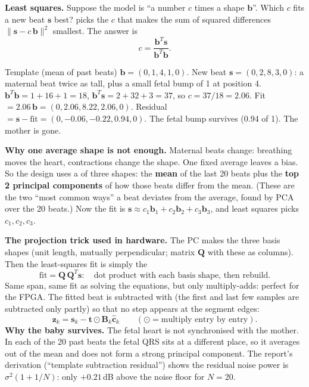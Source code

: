 \documentclass[11pt]{article}
\begin{document}
\textbf{Least squares.} Suppose the model is ``a number $c$ times a shape $\mathbf{b}$''. Which $c$ fits a new beat $\mathbf{s}$ best?  picks the $c$ that makes the sum of squared differences $\|\mathbf{s} - c\,\mathbf{b}\|^2$ smallest. The answer is
\[
c = \frac{\mathbf{b}^T\mathbf{s}}{\mathbf{b}^T\mathbf{b}} .
\]
\begin{simple}
Template (mean of past beats) $\mathbf{b} = (0, 1, 4, 1, 0)$. New beat $\mathbf{s} = (0, 2, 8, 3, 0)$: a maternal beat twice as tall, plus a small fetal bump of 1 at position 4.
$\mathbf{b}^T\mathbf{b} = 1+16+1 = 18$, $\mathbf{b}^T\mathbf{s} = 2+32+3 = 37$, so $c = 37/18 = 2.06$.
Fit $= 2.06\,\mathbf{b} = (0, 2.06, 8.22, 2.06, 0)$. Residual $= \mathbf{s} - \text{fit} = (0, -0.06, -0.22, \mathbf{0.94}, 0)$.
The fetal bump survives (0.94 of 1). The mother is gone.
\end{simple}

\textbf{Why one average shape is not enough.} Maternal beats change: breathing moves the heart, contractions change the shape. One fixed average leaves a bias. So the design uses a  of three shapes: the \textbf{mean} of the last 20 beats plus the \textbf{top 2 principal components} of how those beats differ from the mean. (These are the two ``most common ways'' a beat deviates from the average, found by PCA over the 20 beats.) Now the fit is $\mathbf{s} \approx c_1\mathbf{b}_1 + c_2\mathbf{b}_2 + c_3\mathbf{b}_3$, and least squares picks $c_1, c_2, c_3$.

\textbf{The projection trick used in hardware.} The PC makes the three basis shapes  (unit length, mutually perpendicular; matrix $\mathbf{Q}$ with these as columns). Then the least-squares fit is simply the 
\[
\text{fit} = \mathbf{Q}\,\mathbf{Q}^T\mathbf{s}:\quad \text{dot product with each basis shape, then rebuild.}
\]
Same span, same fit as solving the equations, but only multiply-adds: perfect for the FPGA. The fitted beat is subtracted with  (the first and last few samples are subtracted only partly) so that no step appears at the segment edges:
\[
\mathbf{z}_k = \mathbf{s}_k - \mathbf{t}\odot\mathbf{B}_k\hat{\mathbf{c}}_k \qquad(\odot = \text{multiply entry by entry}).
\]
\textbf{Why the baby survives.} The fetal heart is not synchronised with the mother. In each of the 20 past beats the fetal QRS sits at a different place, so it averages out of the mean and does not form a strong principal component. The report's derivation (``template subtraction residual'') shows the residual noise power is $\sigma^2(1 + 1/N)$: only $+0.21$\,dB above the noise floor for $N = 20$.
\end{document}
